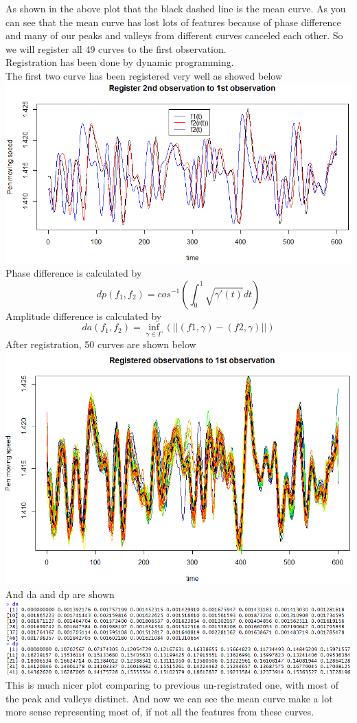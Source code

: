 \documentclass[11pt]{scrartcl}
\begin{document}
As shown in the above plot that the black dashed line is the mean curve. As you can see that the mean curve has lost lots of features because of phase difference and many of our peaks and valleys from different curves canceled each other. So we will register all 49 curves to the first observation.\\
Registration has been done by dynamic programming.\\
The first two curve has been registered very well as showed below\\
\includegraphics[scale=0.7]{fp07.png}\\
Phase difference is calculated by
$$
dp(f_1,f_2)=cos^{-1}(\int_0^1\sqrt{\gamma'(t)}dt)
$$
Amplitude difference is calculated by
$$
da(f_1,f_2)=\inf_{\gamma \in \Gamma}(||(f1,\gamma)-(f2,\gamma)||)
$$
After registration, 50 curves are shown below\\
\includegraphics[scale=0.7]{fp08.png}\\
And da and dp are shown\\
\includegraphics[scale=0.7]{fp09.png}\\
This is much nicer plot comparing to previous un-registrated one, with most of the peak and valleys distinct. And now we can see the mean curve make a lot more sense representing most of, if not all the features from these curves. \\
\end{document}
